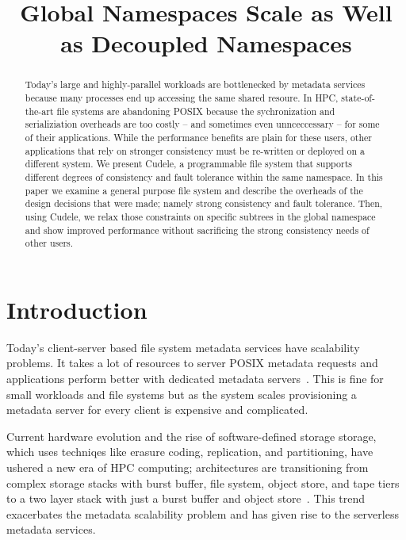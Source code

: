\documentclass[preprint]{sigplanconf-eurosys}
\title{Global Namespaces Scale as Well as Decoupled Namespaces}
\date{}
\begin{document}
\maketitle

\begin{abstract}
Today's large and highly-parallel workloads are bottlenecked by metadata
services because many processes end up accessing the same shared resoure. In
HPC, state-of-the-art file systems are abandoning POSIX because the
sychronization and serializiation overheads are too costly -- and sometimes
even unnceccessary -- for some of their applications.  While the performance
benefits are plain for these users, other applications that rely on stronger
consistency must be re-written or deployed on a different system. We present
Cudele, a programmable file system that supports different degrees of
consistency and fault tolerance within the same namespace.  In this paper we
examine a general purpose file system and describe the overheads of the design
decisions that were made; namely strong consistency and fault tolerance. Then,
using Cudele, we relax those constraints on specific subtrees in the global
namespace and show improved performance without sacrificing the strong
consistency needs of other users.
\end{abstract}

\section{Introduction}

Today's client-server based file system metadata
services have scalability problems. It takes a lot of resources to server POSIX
metadata requests and applications perform better with dedicated metadata
servers~\cite{sevilla:sc15-mantle, ren:sc2014-indexfs}. This is fine for small
workloads and file systems but as the system scales provisioning a metadata
server for every client is expensive and complicated.

Current hardware evolution and the rise of software-defined storage storage,
which uses techniqes like erasure coding, replication, and partitioning, have
ushered a new era of HPC computing; architectures are transitioning from
complex storage stacks with burst buffer, file system, object store, and tape
tiers to a two layer stack with just a burst buffer and object
store~\cite{bent:login16-hpc-trends}. This trend exacerbates the metadata
scalability problem and has given rise to the serverless metadata services.
\end{document}
